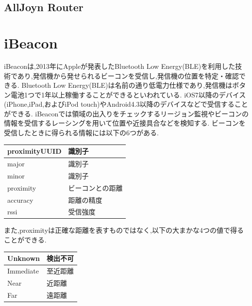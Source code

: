 \subsection{AllJoyn Router}


\section{iBeacon}
iBeacon\cite{iBeacon}は,2013年にAppleが発表したBluetooth Low Energy(BLE)を利用した技術であり,発信機から発せられるビーコンを受信し,発信機の位置を特定・確認できる.
Bluetooth Low Energy(BLE)は名前の通り低電力仕様であり,発信機はボタン電池1つで1年以上稼働することができるといわれている.
iOS7以降のデバイス(iPhone,iPad,およびiPod touch)やAndroid4.3以降のデバイスなどで受信することができる.
iBeaconでは領域の出入りをチェックするリージョン監視やビーコンの情報を受信するレーシングを用いて位置や近接具合などを検知する.
ビーコンを受信したときに得られる情報には以下の6つがある.

\begin{center}
\begin{table}[htb]
\begin{tabular}{|l|l|}  \hline
proximityUUID & 識別子 \\ \hline
major & 識別子 \\  \hline
minor & 識別子 \\ \hline
proximity & ビーコンとの距離 \\ \hline
accuracy & 距離の精度 \\ \hline
rssi & 受信強度 \\ \hline
\end{tabular}
\end{table}
\end{center}

また,proximityは正確な距離を表すものではなく,以下の大まかな4つの値で得ることができる.

\begin{center}
\begin{table}[htb]
\begin{tabular}{|l|l|} \hline
Unknown & 検出不可 \\ \hline
Immediate & 至近距離 \\ \hline
Near & 近距離 \\ \hline
Far & 遠距離 \\ \hline
\end{tabular}
\end{table}
\end{center}
